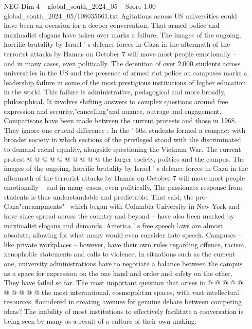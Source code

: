 \begin{textsample}{NEG Dim 4 – global\_south\_2024\_05 – Score 1.00 – global\_south\_2024\_05/108035661.txt}  \label{ex:f4_neg_260}
Agitations across US universities could have been an occasion for a deeper conversation.
That armed police and maximalist slogans have taken over marks a failure.
The images of the ongoing, horrific brutality by Israel ' s defence forces in Gaza in the aftermath of the terrorist attacks by Hamas on October 7 will move most people emotionally -- and in many cases, even politically.
The detention of over 2,000 students across universities in the US and the presence of armed riot police on campuses marks a leadership failure in some of the most prestigious institutions of higher education in the world.
This failure is administrative, pedagogical and more broadly, philosophical.
It involves shifting answers to complex questions around free expression and security,"cancelling"and nuance, outrage and engagement.
Comparisons have been made between the current protests and those in 1968.
They ignore one crucial difference : In the ' 60s, students formed a compact with broader society in which sections of the privileged stood with the discriminated to demand racial equality, alongside questioning the Vietnam War.
The current protest @ @ @ @ @ @ @ @ @ @ the larger society, politics and the campus.
The images of the ongoing, horrific brutality by Israel ' s defence forces in Gaza in the aftermath of the terrorist attacks by Hamas on October 7 will move most people emotionally -- and in many cases, even politically.
The passionate response from students is thus understandable and predictable.
That said, the pro-Gaza"encampments"-- which began with Columbia University in New York and have since spread across the country and beyond -- have also been marked by maximalist slogans and demands.
America ' s free speech laws are almost absolute, allowing for what many would even consider hate speech.
Campuses -- like private workplaces -- however, have their own rules regarding offence, racism, xenophobic statements and calls to violence.
In situations such as the current one, university administrations have to negotiate a balance between the campus as a space for expression on the one hand and order and safety on the other.
They have failed so far.
The most important question that arises in @ @ @ @ @ @ @ @ @ @ the most international, cosmopolitan spaces, with vast intellectual resources, floundered in creating avenues for genuine debate between competing ideas?
The inability of most institutions to effectively facilitate a conversation is being seen by many as a result of a culture of their own making.

\end{textsample}
